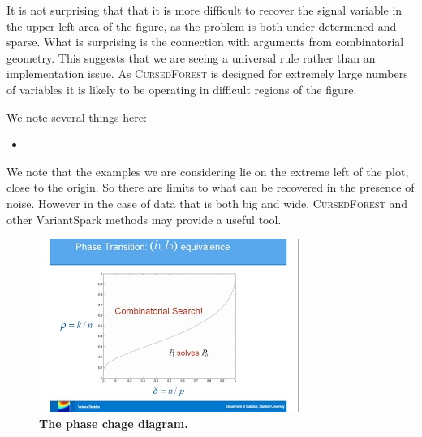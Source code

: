 \documentclass[10pt,letterpaper]{article}
\newcommand{\cursedforest}{\textsc{CursedForest}\xspace}
\begin{document}
It is not surprising that that it is more difficult to recover the signal variable in the upper-left area of the figure,
as the problem is both under-determined and sparse. What is surprising is the connection with arguments from
combinatorial geometry. This suggests that we are seeing a universal rule rather than an implementation issue. As
\cursedforest is designed for extremely large numbers of variables it is likely to be operating in difficult regions of
the figure. 

We note several things here:
\begin{itemize}
\item 
\end{itemize}

We note that the examples we are considering lie on the extreme left of the plot, close to the origin. So there are
limits to what can be recovered in the presence of noise. However in the case of data that is both big and wide,
\cursedforest and other VariantSpark methods may provide a useful tool.


\begin{figure}[tbhp] 
 \begin{adjustwidth}{-1.00in}{0in}
    \centering
    \includegraphics[totalheight=6cm]{./figs/phase-diagram-equivalence.png} 
    \caption{{\bf The phase chage diagram.}}
    \label{figure:phase-diagram-equivalence.png} 
    \vspace{4ex}
  \end{adjustwidth}
\end{figure}
\end{document}
